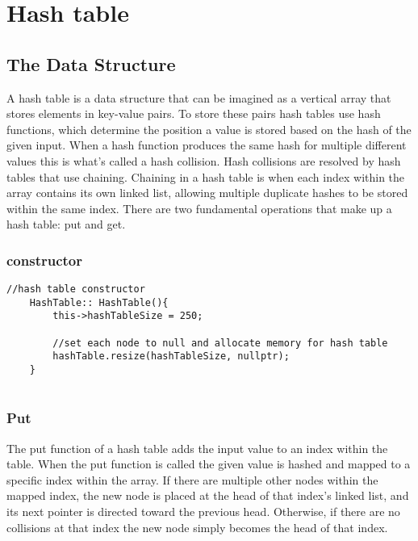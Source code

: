 \documentclass[letterpaper, 10pt,DIV=13]{scrartcl}
\numberwithin{equation}{section} %
\numberwithin{figure}{section} %
\numberwithin{table}{section} %
\begin{document}
\pagebreak
\section{Hash table}

\subsection{The Data Structure}
A hash table is a data structure that can be imagined as a vertical array that stores elements in key-value pairs. To store these pairs hash tables use hash functions, which determine the position a value is stored based on the hash of the given input. When a hash function produces the same hash for multiple different values this is what's called a hash collision. Hash collisions are resolved by hash tables that use chaining. Chaining in a hash table is when each index within the array contains its own linked list, allowing multiple duplicate hashes to be stored within the same index. There are two fundamental operations that make up a hash table: put and get.

\subsubsection*{constructor}
    \lstset{numbers=left, numberstyle=\tiny, stepnumber=1, numbersep=5pt, basicstyle=\footnotesize\ttfamily}
    \begin{lstlisting}[frame=single, ]
    //hash table constructor
    HashTable:: HashTable(){
        this->hashTableSize = 250;
    
        //set each node to null and allocate memory for hash table
        hashTable.resize(hashTableSize, nullptr);
    }
    
\end{lstlisting}

\subsubsection{Put}
The put function of a hash table adds the input value to an index within the table. When the put function is called the given value is hashed and mapped to a specific index within the array. If there are multiple other nodes within the mapped index, the new node is placed at the head of that index's linked list, and its next pointer is directed toward the previous head. Otherwise, if there are no collisions at that index the new node simply becomes the head of that index.
\end{document}
